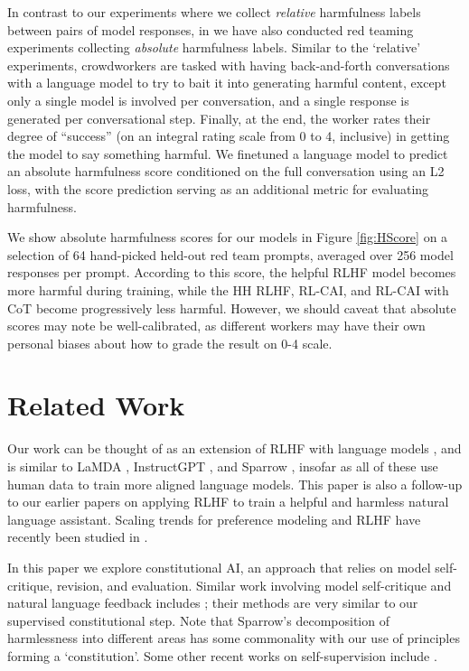 \documentclass[english]{article}
\renewcommand\>{\rangle}
\begin{document}
In contrast to our experiments where we collect {\it relative} harmfulness labels between pairs of model responses, in \cite{DeepRedTeaming} we have also conducted red teaming experiments collecting {\it absolute} harmfulness labels.  Similar to the `relative' experiments, crowdworkers are tasked with having back-and-forth conversations with a language model to try to bait it into generating harmful content, except only a single model is involved per conversation, and a single response is generated per conversational step. Finally, at the end, the worker rates their degree of ``success'' (on an integral rating scale from 0 to 4, inclusive) in getting the model to say something harmful. We finetuned a language model to predict an absolute harmfulness score conditioned on the full conversation using an L2 loss, with the score prediction serving as an additional metric for evaluating harmfulness.

We show absolute harmfulness scores for our models in Figure \ref{fig:HScore} on a selection of 64 hand-picked held-out red team prompts, averaged over 256 model responses per prompt. According to this score, the helpful RLHF model becomes more harmful during training, while the HH RLHF, RL-CAI, and RL-CAI with CoT become progressively less harmful. However, we should caveat that absolute scores may note be well-calibrated, as different workers may have their own personal biases about how to grade the result on 0-4 scale.



\section{Related Work}

Our work can be thought of as an extension of RLHF \cite{christiano2017deep} with language models \cite{stiennon2020learning}, and is similar to LaMDA \cite{LaMDA}, InstructGPT \cite{InstructGPT}, and Sparrow \cite{SparrowDM}, insofar as all of these use human data to train more aligned language models. This paper is also a follow-up to our earlier papers \cite{askell2021general, bai2022training} on applying RLHF to train a helpful and harmless natural language assistant.  Scaling trends for preference modeling and RLHF have recently been studied in \cite{ScalingLawsPM}.

In this paper  we explore constitutional AI, an approach that relies on model self-critique, revision, and evaluation. Similar work involving model self-critique and natural language feedback includes \cite{EthicalAdviceTaker, PerezLanguageFeedback,  OAISelfCritique}; their methods are very similar to our supervised constitutional step.   Note that Sparrow's \cite{SparrowDM} decomposition of harmlessness into different areas has some commonality with our use of principles forming a `constitution'.  Some other recent works on self-supervision include \cite{LemonsRelabeling, SelfImproveCapabilities}.
\end{document}
